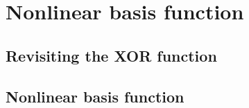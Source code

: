\section{Nonlinear basis function}

\subsection{Revisiting the XOR function}

\subsection{Nonlinear basis function}


